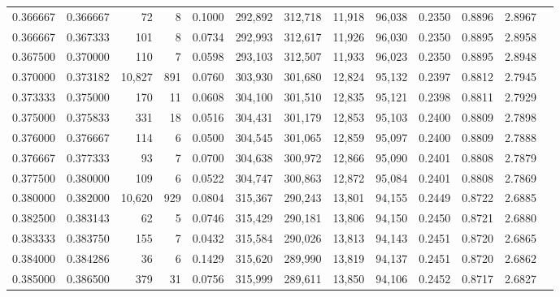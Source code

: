 \begin{tabular}{rrrrrrrrrrrrr}
0.366667 & 0.366667 &     72 &     8 &                                     0.1000 & 292,892 & 312,718 &  11,918 &  96,038 & 0.2350 & 0.8896 & 2.8967 \\
0.366667 & 0.367333 &    101 &     8 &                                     0.0734 & 292,993 & 312,617 &  11,926 &  96,030 & 0.2350 & 0.8895 & 2.8958 \\
0.367500 & 0.370000 &    110 &     7 &                                     0.0598 & 293,103 & 312,507 &  11,933 &  96,023 & 0.2350 & 0.8895 & 2.8948 \\
0.370000 & 0.373182 & 10,827 &   891 &                                     0.0760 & 303,930 & 301,680 &  12,824 &  95,132 & 0.2397 & 0.8812 & 2.7945 \\
0.373333 & 0.375000 &    170 &    11 &                                     0.0608 & 304,100 & 301,510 &  12,835 &  95,121 & 0.2398 & 0.8811 & 2.7929 \\
0.375000 & 0.375833 &    331 &    18 &                                     0.0516 & 304,431 & 301,179 &  12,853 &  95,103 & 0.2400 & 0.8809 & 2.7898 \\
0.376000 & 0.376667 &    114 &     6 &                                     0.0500 & 304,545 & 301,065 &  12,859 &  95,097 & 0.2400 & 0.8809 & 2.7888 \\
0.376667 & 0.377333 &     93 &     7 &                                     0.0700 & 304,638 & 300,972 &  12,866 &  95,090 & 0.2401 & 0.8808 & 2.7879 \\
0.377500 & 0.380000 &    109 &     6 &                                     0.0522 & 304,747 & 300,863 &  12,872 &  95,084 & 0.2401 & 0.8808 & 2.7869 \\
0.380000 & 0.382000 & 10,620 &   929 &                                     0.0804 & 315,367 & 290,243 &  13,801 &  94,155 & 0.2449 & 0.8722 & 2.6885 \\
0.382500 & 0.383143 &     62 &     5 &                                     0.0746 & 315,429 & 290,181 &  13,806 &  94,150 & 0.2450 & 0.8721 & 2.6880 \\
0.383333 & 0.383750 &    155 &     7 &                                     0.0432 & 315,584 & 290,026 &  13,813 &  94,143 & 0.2451 & 0.8720 & 2.6865 \\
0.384000 & 0.384286 &     36 &     6 &                                     0.1429 & 315,620 & 289,990 &  13,819 &  94,137 & 0.2451 & 0.8720 & 2.6862 \\
0.385000 & 0.386500 &    379 &    31 &                                     0.0756 & 315,999 & 289,611 &  13,850 &  94,106 & 0.2452 & 0.8717 & 2.6827 \\

\end{tabular}
